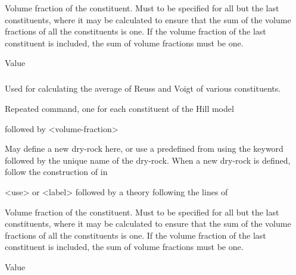 {
 \slist
   \item \Description Volume fraction of the constituent. Must to be specified for all but the last constituents, where it may be calculated to ensure that the sum of the volume fractions of all the constituents is one. If the volume fraction of the last constituent is included, the sum of volume fractions must be one. 
   \item \Argument Value
   \item \Default
 \elist

\subparagraph{}
 \slist
   \item \Description Used for calculating the average of Reuss and Voigt of various constituents.
   \item \Argument
   \item \Default 
 \elist

 \slist
   \item \Description Repeated command, one for each constituent of the Hill model
   \item {} followed by <volume-fraction>
   \item \Default
 \elist

 \slist
   \item \Description May define a new dry-rock here, or use a predefined  from  using the keyword  followed by the unique name of the dry-rock. When a new dry-rock is defined, follow the construction of  in 
   \item \Argument <use> or <label> followed by a theory following the lines of 
   \item \Default
 \elist

 \slist
   \item \Description Volume fraction of the constituent. Must to be specified for all but the last constituents, where it may be calculated to ensure that the sum of the volume fractions of all the constituents is one. If the volume fraction of the last constituent is included, the sum of volume fractions must be one. 
   \item \Argument Value
   \item \Default
 \elist

}
